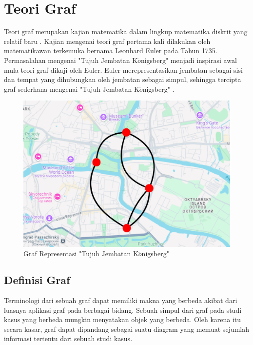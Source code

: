 \section{Teori Graf}
\vspace{-4mm}
{\frenchspacing
    Teori graf merupakan kajian matematika dalam lingkup matematika diskrit yang relatif baru .
    Kajian mengenai teori graf pertama kali dilakukan oleh matematikawan terkemuka bernama Leonhard Euler pada Tahun 1735.
    Permasalahan mengenai "Tujuh Jembatan K$\ddot{o}$nigsberg" menjadi inspirasi awal mula teori graf dikaji oleh Euler.
    Euler merepresentasikan jembatan sebagai sisi dan tempat yang dihubungkan oleh jembatan sebagai simpul, sehingga tercipta graf
    sederhana mengenai "Tujuh Jembatan K$\ddot{o}$nigsberg" .

    \begin{figure}
        \centering
        \includegraphics[width=0.5\linewidth]{gambar/Graf Konigsberg.png}
        \vspace{5mm}
        \caption{Graf Representasi "Tujuh Jembatan K$\ddot{o}$nigsberg"}
        \label{gam:Graf Konigsberg}
    \end{figure}

    \vspace{-5mm}
    \subsection{Definisi Graf}
    {\frenchspacing
        Terminologi dari sebuah graf dapat memiliki makna yang berbeda akibat dari luasnya aplikasi graf pada berbagai bidang.
        Sebuah simpul dari graf pada studi kasus yang berbeda mungkin menyatakan objek yang berbeda.
        Oleh karena itu secara kasar, graf dapat dipandang sebagai suatu diagram yang memuat sejumlah informasi tertentu dari sebuah studi kasus.

}}
